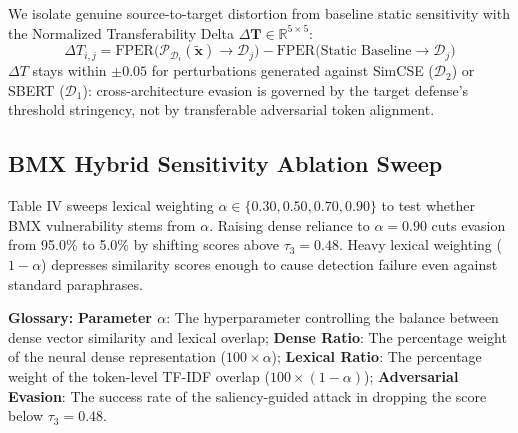 \documentclass[conference,onecolumn,11pt]{IEEEtran}
\begin{document}
We isolate genuine source-to-target distortion from baseline static sensitivity with the Normalized Transferability Delta $\Delta \mathbf{T} \in \mathbb{R}^{5 \times 5}$:
\begin{equation}
    \Delta T_{i, j} = \text{FPER}\big(\mathcal{P}_{\mathcal{D}_i}(\mathbf{\tilde{x}}) \to \mathcal{D}_j\big) - \text{FPER}\big(\text{Static Baseline} \to \mathcal{D}_j\big)
    \label{eq:delta_transfer}
\end{equation}
$\Delta T$ stays within $\pm 0.05$ for perturbations generated against SimCSE ($\mathcal{D}_2$) or SBERT ($\mathcal{D}_1$): cross-architecture evasion is governed by the target defense's threshold stringency, not by transferable adversarial token alignment.

\subsection{BMX Hybrid Sensitivity Ablation Sweep}

Table IV sweeps lexical weighting $\alpha \in \{0.30, 0.50, 0.70, 0.90\}$ to test whether BMX vulnerability stems from $\alpha$. Raising dense reliance to $\alpha = 0.90$ cuts evasion from 95.0\% to 5.0\% by shifting scores above $\tau_3 = 0.48$. Heavy lexical weighting ($1 - \alpha$) depresses similarity scores enough to cause detection failure even against standard paraphrases.

\begin{table}[htbp]
\centering
\caption{BMX Hybrid Defense Sensitivity to Lexical Weighting Parameter $\alpha$ (Calibrated $\tau_3 = 0.48$).}
\label{tab:bmx_ablation}
\vspace{1em}
\small \textbf{Glossary:} \textbf{Parameter $\alpha$}: The hyperparameter controlling the balance between dense vector similarity and lexical overlap; \textbf{Dense Ratio}: The percentage weight of the neural dense representation ($100 \times \alpha$); \textbf{Lexical Ratio}: The percentage weight of the token-level TF-IDF overlap ($100 \times (1-\alpha)$); \textbf{Adversarial Evasion}: The success rate of the saliency-guided attack in dropping the score below $\tau_3=0.48$.
\end{table}
\end{document}
